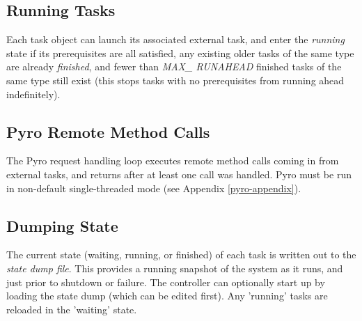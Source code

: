 \subsection{Running Tasks}

Each task object can launch its associated external task, and enter the
{\em running} state if its prerequisites are all satisfied, any existing
older tasks of the same type are already {\em finished}, and fewer than
{\em MAX\_ RUNAHEAD} finished tasks of the same type still exist (this
stops tasks with no prerequisites from running ahead indefinitely).

\subsection{Pyro Remote Method Calls}

The Pyro request handling loop executes remote method calls coming in
from external tasks, and returns after at least one call was handled.
Pyro must be run in non-default single-threaded mode (see Appendix
\ref{pyro-appendix}).

\subsection{Dumping State} 

The current state (waiting, running, or finished) of each task is
written out to the {\em state dump file}.  This provides a running
snapshot of the system as it runs, and just prior to shutdown or
failure. The controller can optionally start up by loading the state
dump (which can be edited first). Any 'running' tasks are reloaded in
the 'waiting' state.


